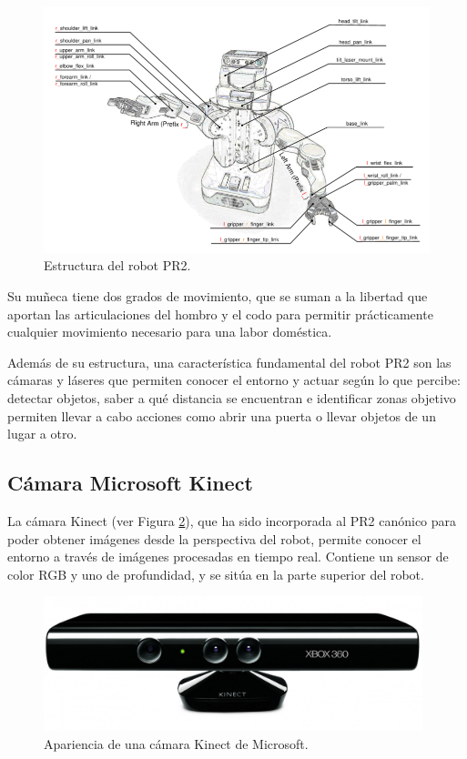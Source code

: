 \documentclass[12pt,spanish,chapterprefix, numbers=noenddot]{book}
\numberwithin{equation}{section}
\numberwithin{figure}{section}
\begin{document}
\begin{figure}[hbt!]
\centering
\includegraphics[width=12cm]{Figs/PR2_structure.png}
\par
\caption{\label{fig:pr2Structure}Estructura del robot PR2.}
\end{figure}

Su muñeca tiene dos grados de movimiento, que se suman a la libertad que aportan las articulaciones del hombro y el codo para permitir prácticamente cualquier movimiento necesario para una labor doméstica.

Además de su estructura, una característica fundamental del robot PR2 son las cámaras y láseres que permiten conocer el entorno y actuar según lo que percibe: detectar objetos, saber a qué distancia se encuentran e identificar zonas objetivo permiten llevar a cabo acciones como abrir una puerta o llevar objetos de un lugar a otro.

\subsection{Cámara Microsoft Kinect}
La cámara Kinect (ver Figura \ref{fig:kinect}), que ha sido incorporada al PR2 canónico para poder obtener imágenes desde la perspectiva del robot, permite conocer el entorno a través de imágenes procesadas en tiempo real. 
Contiene un sensor de color RGB y uno de profundidad, y se sitúa en la parte superior del robot. 

\begin{figure}[hbt!]
\centering
\includegraphics[width=11cm]{Figs/kinect.jpg}
\par
\caption{\label{fig:kinect}Apariencia de una cámara Kinect de Microsoft.}
\end{figure}
\end{document}
